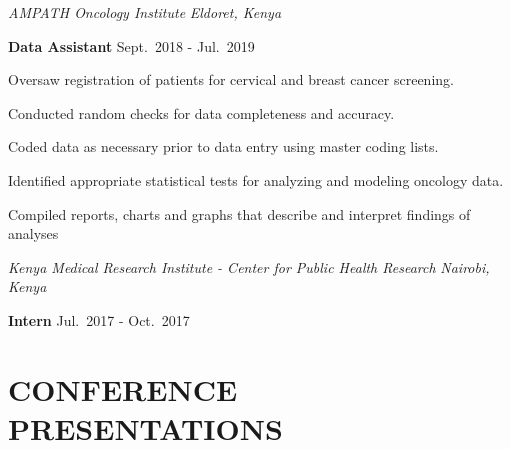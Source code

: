 \documentclass[13pt,]{article}
\providecommand{\tightlist}{%
  \setlength{\itemsep}{0pt}\setlength{\parskip}{0pt}}
\renewenvironment{itemize}{
  \begin{list}{}{
    \setlength{\leftmargin}{1.5em}
  }
}{
  \end{list}
}
\begin{document}
\emph{AMPATH Oncology Institute} \hfill \emph{Eldoret, Kenya}

\textbf{Data Assistant} \hfill Sept.~2018 - Jul.~2019

\begin{itemize}
\tightlist
\item
  Oversaw registration of patients for cervical and breast cancer
  screening.
\item
  Conducted random checks for data completeness and accuracy.
\item
  Coded data as necessary prior to data entry using master coding lists.
\item
  Identified appropriate statistical tests for analyzing and modeling
  oncology data.
\item
  Compiled reports, charts and graphs that describe and interpret
  findings of analyses
\end{itemize}

\emph{Kenya Medical Research Institute - Center for Public Health
Research} \hfill \emph{Nairobi, Kenya}

\textbf{Intern} \hfill Jul.~2017 - Oct.~2017

\hypertarget{conference-presentations}{%
\section{\texorpdfstring{\textbf{CONFERENCE
PRESENTATIONS}}{CONFERENCE PRESENTATIONS}}\label{conference-presentations}}
\end{document}
